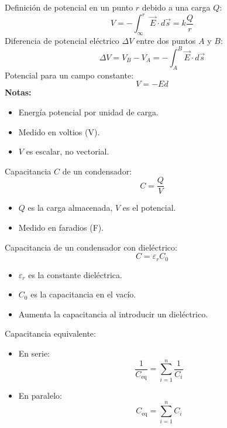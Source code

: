 \begin{tcolorbox}[title=Potencial Eléctrico]
  Definición de potencial en un punto \(r\) debido a una carga \(Q\):
  \[
    V = -\int_{\infty}^{r} \vec{E} \cdot d\vec{s} = k \frac{Q}{r}
  \]
  Diferencia de potencial eléctrico \(\Delta V\) entre dos puntos \(A\) y \(B\):
  \[
    \Delta V = V_B - V_A = -\int_{A}^{B} \vec{E} \cdot d\vec{s}
  \]
  Potencial para un campo constante:
  \[
    V = -Ed
  \]
  \textbf{Notas:}
  \begin{itemize}
    \item Energía potencial por unidad de carga.
    \item Medido en voltios (V).
    \item \(V\) es escalar, no vectorial.
  \end{itemize}
\end{tcolorbox}

\begin{tcolorbox}[title=Capacitancia]
  Capacitancia \(C\) de un condensador:
  \[
    C = \frac{Q}{V}
  \]
  \begin{itemize}
    \item \(Q\) es la carga almacenada, \(V\) es el potencial.
    \item Medido en faradios (F).
  \end{itemize}
  Capacitancia de un condensador con dieléctrico:
  \[
    C = \varepsilon_r C_0
  \]
  \begin{itemize}
    \item \(\varepsilon_r\) es la constante dieléctrica.
    \item \(C_0\) es la capacitancia en el vacío.
    \item Aumenta la capacitancia al introducir un dieléctrico.
  \end{itemize}
  Capacitancia equivalente:
  \begin{itemize}
    \item En serie:
      \[
        \frac{1}{C_{\text{eq}}} = \sum_{i=1}^{n} \frac{1}{C_i}
      \]
    \item En paralelo:
      \[
        C_{\text{eq}} = \sum_{i=1}^{n} C_i
      \]
  \end{itemize}
\end{tcolorbox}